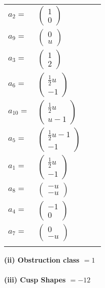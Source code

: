 \documentclass[1p]{elsarticle_modified}
\theoremstyle{definition}
\begin{document}
\begin{tabular}{m{7pt} m{180pt} m{7pt} m{180pt} }
\flushright $a_{2}=$&$\begin{pmatrix}1\\0\end{pmatrix}$ \\
\flushright $a_{9}=$&$\begin{pmatrix}0\\u\end{pmatrix}$ \\
\flushright $a_{3}=$&$\begin{pmatrix}1\\2\end{pmatrix}$ \\
\flushright $a_{6}=$&$\begin{pmatrix}\frac{1}{2} u\\-1\end{pmatrix}$ \\
\flushright $a_{10}=$&$\begin{pmatrix}\frac{1}{2} u\\u-1\end{pmatrix}$ \\
\flushright $a_{5}=$&$\begin{pmatrix}\frac{1}{2} u-1\\-1\end{pmatrix}$ \\
\flushright $a_{1}=$&$\begin{pmatrix}\frac{1}{2} u\\-1\end{pmatrix}$ \\
\flushright $a_{8}=$&$\begin{pmatrix}- u\\- u\end{pmatrix}$ \\
\flushright $a_{4}=$&$\begin{pmatrix}-1\\0\end{pmatrix}$ \\
\flushright $a_{7}=$&$\begin{pmatrix}0\\- u\end{pmatrix}$\\&\end{tabular}
\flushleft \textbf{(ii) Obstruction class $= 1$}\\~\\
\flushleft \textbf{(iii) Cusp Shapes $= -12$}\\~\\
\end{document}
